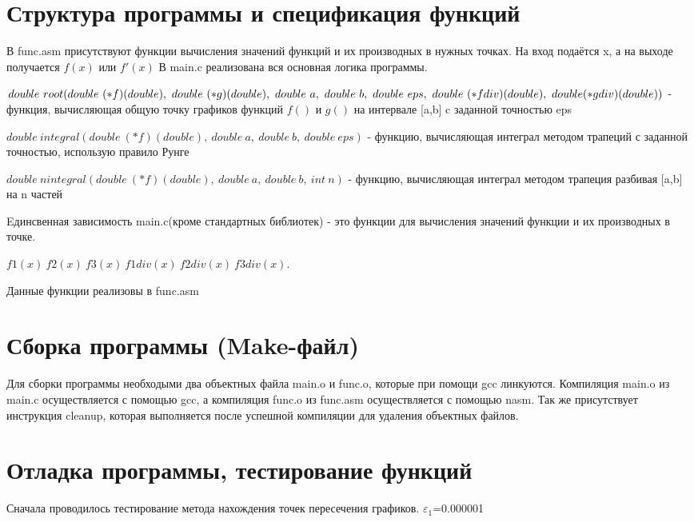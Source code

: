 \documentclass[a4paper,12pt,titlepage,finall]{article}
\begin{document}
\newpage

\section{Структура программы и спецификация функций}

В func.asm присутствуют функции вычисления значений функций и их производных в нужных точках. На вход подаётся x, а на выходе получается $f(x)$ или $f'(x)$
В main.c реализована вся основная логика программы.

$double~root(double~(*f)(double),~double~(*g)(double),~double~a,~double~b,~double~eps, \\ ~double~(*fdiv)(double),~double (*gdiv)(double))$ - функция, вычисляющая общую точку графиков функций $f()$ и $g()$ на интервале [a,b] c заданной точностью eps

$double~integral(double~(*f)(double),~double~a,~double~b,~double~eps)$ - функцию, вычисляющая интеграл методом трапеций с заданной точностью, использую правило Рунге

$double~nintegral(double~(*f)(double),~double~a,~double~b,~int~n)$ - функцию, вычисляющая интеграл методом трапеция разбивая [a,b] на n частей

Eдинсвенная зависимость main.c(кроме стандартных библиотек) -  это функции для вычисления значений функции и их производных в точке.

$f1(x)~f2(x)~f3(x)~f1div(x)~f2div(x)~f3div(x)$. 

Данные функции реализовы в func.asm
\newpage

\section{Сборка программы (Make-файл)}

Для сборки программы необходыми два объектных файла main.o и func.o, которые при помощи gcc линкуются. Компиляция main.o из main.c осуществляется с помощью gcc, а компиляция func.o из func.asm осуществляется с помощью nasm.
Так же присутствует инструкция cleanup, которая выполняется после успешной компиляции для удаления объектных файлов.


\newpage

\section{Отладка программы, тестирование функций}

Сначала проводилось тестирование метода нахождения точек пересечения графиков. $\varepsilon_1$=0.000001
\end{document}
